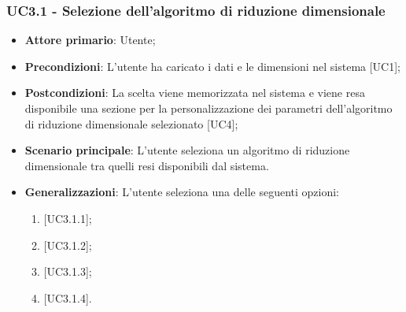 \subsubsection{UC3.1 - Selezione dell'algoritmo di riduzione dimensionale}
\begin{itemize}
	\item \textbf{Attore primario}: Utente;
	\item \textbf{Precondizioni}: L'utente ha caricato i dati e le dimensioni nel sistema [UC1];
	\item \textbf{Postcondizioni}: La scelta viene memorizzata nel sistema e viene resa disponibile una sezione per la personalizzazione dei parametri dell'algoritmo di riduzione dimensionale selezionato [UC4];
	\item \textbf{Scenario principale}: L'utente seleziona un algoritmo di riduzione dimensionale tra quelli resi disponibili dal sistema.
	\item \textbf{Generalizzazioni}: L'utente seleziona una delle seguenti opzioni:
	\begin{enumerate}[1.]
		\item {} [UC3.1.1];
		\item {} [UC3.1.2];
		\item {} [UC3.1.3];
		\item {} [UC3.1.4].
	\end{enumerate}
\end{itemize}